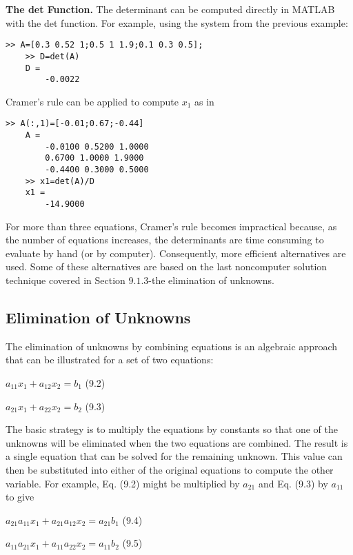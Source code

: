 \documentclass[../main.tex]{subfiles}
\begin{document}
\textbf{The det Function.} The determinant can be computed directly in MATLAB with the det function. For example, using the system from the previous example:

\begin{lstlisting}[numbers=none,frame=none]
    >> A=[0.3 0.52 1;0.5 1 1.9;0.1 0.3 0.5];
    >> D=det(A)
    D =
        -0.0022
\end{lstlisting}

Cramer's rule can be applied to compute $x_{1}$ as in

\begin{lstlisting}[numbers=none,frame=none]
    >> A(:,1)=[-0.01;0.67;-0.44]
    A =
        -0.0100 0.5200 1.0000
        0.6700 1.0000 1.9000
        -0.4400 0.3000 0.5000
    >> x1=det(A)/D
    x1 =
        -14.9000
\end{lstlisting}

For more than three equations, Cramer's rule becomes impractical because, as the number of equations increases, the determinants are time consuming to evaluate by hand (or by computer). Consequently, more efficient alternatives are used. Some of these alternatives are based on the last noncomputer solution technique covered in Section $9.1 .3$-the elimination of unknowns.

\subsection{Elimination of Unknowns}

The elimination of unknowns by combining equations is an algebraic approach that can be illustrated for a set of two equations:
\begin{center}
$a_{11} x_{1}+a_{12} x_{2}=b_{1}$ \hfill{(9.2)}

$a_{21} x_{1}+a_{22} x_{2}=b_{2}$ \hfill{(9.3)}
\end{center}

The basic strategy is to multiply the equations by constants so that one of the unknowns will be eliminated when the two equations are combined. The result is a single equation that can be solved for the remaining unknown. This value can then be substituted into either of the original equations to compute the other variable.
For example, Eq. (9.2) might be multiplied by $a_{21}$ and Eq. (9.3) by $a_{11}$ to give

\begin{center}
$a_{21} a_{11} x_{1}+a_{21} a_{12} x_{2}=a_{21} b_{1}$ \hfill{(9.4)}

$a_{11} a_{21} x_{1}+a_{11} a_{22} x_{2}=a_{11} b_{2}$ \hfill{(9.5)}
\end{center}
\end{document}
